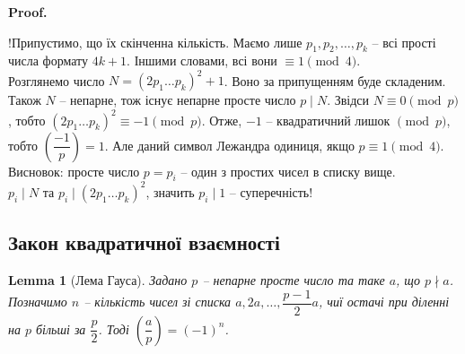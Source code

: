 \documentclass[a4paper, 10pt]{article}
\makeatletter
\theoremstyle{theoremdd}
\theoremstyle{theoremdd}
\theoremstyle{theoremdd}
\theoremstyle{theoremdd}
\theoremstyle{theoremdd}
\theoremstyle{theoremdd}
\theoremstyle{theoremdd}
\newtheorem{lemma}[theorem]{Lemma}
\theoremstyle{theoremdd}
\renewenvironment{proof}[1][Proof.\\]{\par
\pushQED{\hfill \qed}%
\normalfont \topsep6\p@\@plus6\p@\relax
\trivlist
\item\relax
{\bfseries
#1\@addpunct{.}}\hspace\labelsep\ignorespaces
}{%
\popQED\endtrivlist\@endpefalse
}
\makeatother
\begin{document}
\begin{proof}
!Припустимо, що їх скінченна кількість. Маємо лише $p_1,p_2,\dots,p_k$ -- всі прості числа формату $4k+1$. Іншими словами, всі вони $\equiv 1 \pmod 4$.\\
Розглянемо число $N = (2p_1\dots p_k)^2 + 1$. Воно за припущенням буде складеним. Також $N$ -- непарне, тож існує непарне просте число $p \mid N$. Звідси $N \equiv 0 \pmod p$, тобто $(2p_1 \dots p_k)^2 \equiv -1 \pmod p$. Отже, $-1$ -- квадратичний лишок $\!\! \pmod p$, тобто $\left( \dfrac{-1}{p} \right) = 1$. Але даний символ Лежандра одиниця, якщо $p \equiv 1 \pmod 4$. Висновок: просте число $p = p_i$ -- один з простих чисел в списку вище.\\
$p_i \mid N$ та $p_i \mid ( 2 p_1 \dots p_k)^2$, значить $p_i \mid 1$ -- суперечність!
\end{proof}

\subsection{Закон квадратичної взаємності}
\begin{lemma}[Лема Гауса]
Задано $p$ -- непарне просте число та таке $a$, що $p \nmid a$. Позначимо $n$ -- кількість чисел зі списка $a,2a,\dots, \dfrac{p-1}{2}a$, чиї остачі при діленні на $p$ більші за $\dfrac{p}{2}$. Тоді $\left( \dfrac{a}{p} \right) = (-1)^n$.
\end{lemma}
\end{document}
